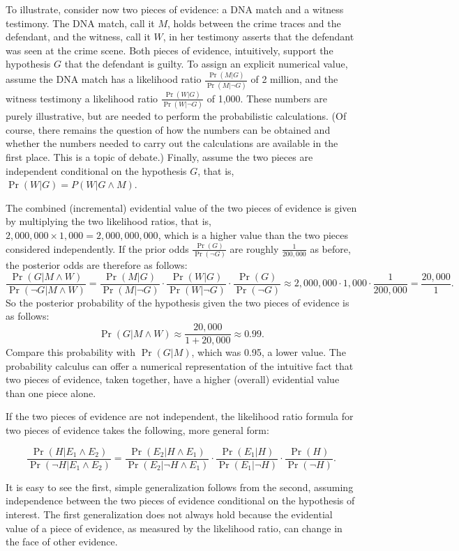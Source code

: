 \documentclass[10pt]{article}
\begin{document}
To illustrate, consider now two pieces of evidence: a DNA match and a witness testimony.
The DNA match, call it $M$, holds between the crime traces and the defendant, and 
the witness, call it $W$, in her testimony asserts that the defendant was 
seen at the crime scene. 
Both pieces of evidence, intuitively, support the hypothesis $G$ that the defendant 
is guilty. To assign an explicit numerical value, assume
 the DNA match has a likelihood ratio $\frac{\Pr(M | G)}{\Pr( M | \neg G)}$ of 2 million, 
and the witness testimony a likelihood ratio $\frac{\Pr(W | G)}{\Pr( W | \neg G)}$ of 1,000. 
These numbers are purely illustrative, but are needed to perform the probabilistic calculations. (Of course, there remains the 
question of how the numbers can be obtained and whether the numbers 
needed to carry out the calculations are available in the first place. This is a topic of debate.) Finally, assume the two pieces are independent conditional on the hypothesis $G$, that is, 
$\Pr(W|G)=P(W| G\wedge M)$. 

The combined (incremental) evidential value of the two pieces of evidence is given by multiplying the two likelihood 
ratios, that is, $2,000,000\times 1,000=2,000,000,000$, which is a higher value 
than the two pieces considered independently. 
If the prior odds $\frac{\Pr(G)}{\Pr(\neg G)}$ are roughly $\frac{1}{200,000}$
as before, the posterior odds are therefore as follows:
%
\[\frac{\Pr(G|M\wedge W)}{\Pr(\neg G|M\wedge W)}= \frac{\Pr(M |G)}{\Pr( M | \neg G)}\cdot \frac{\Pr(W |G)}{\Pr( W | \neg G)}\cdot \frac{\Pr(G)}{\Pr(\neg G)} \approx 2,000,000 \cdot 1,000 \cdot \frac{1}{200,000}= \frac{20,000}{1}.\]
% 
So the posterior probability of the hypothesis given the two pieces of evidence is as follows:
%
\[\Pr(G|M\wedge W) \approx \frac{20,000}{1+20,000}\approx 0.99.\]
%
Compare this probability with $\Pr(G|M)$, which 
was 0.95, a lower value. The probability calculus can offer a numerical 
representation of the intuitive fact that two pieces of evidence, taken together, 
have a higher (overall) evidential value than one piece alone. 

 If the two pieces of evidence are not independent, 
the likelihood ratio formula for two pieces of evidence 
takes the following, more general 
form:

	\[ \frac{\Pr(H|E_1 \land E_2)}{\Pr(\neg H | E_1 \land E_2)} = 
	\frac{\Pr(E_2 | H \land E_1)}{\Pr(E_2| \neg H \land E_1)}
	\cdot 
	\frac{\Pr(E_1 | H)}{\Pr(E_1| \neg H)}
	\cdot 
	\frac{\Pr(H)}{\Pr(\neg H)}.\]

\noindent It is easy to see the first, simple generalization follows from the second, assuming 
independence between the two pieces of evidence conditional on the hypothesis of interest. 
The first generalization does not always hold because 
the evidential value of a piece of evidence, as measured by the likelihood ratio, 
can change in the face of other evidence. 
\end{document}
